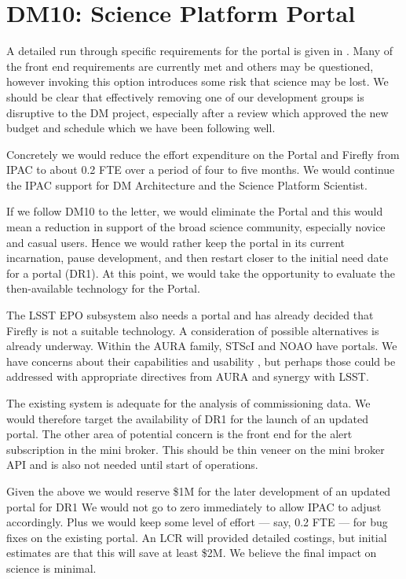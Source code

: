 \section{DM10: Science Platform Portal}\label{sect:dm10}

A detailed run through specific requirements for the portal is given in .
Many of the front end requirements are currently met and others may be questioned, however invoking this option introduces some risk that science may be lost.
We should be clear that effectively removing one of our development groups is disruptive to the DM project,
 especially after a
review which approved the new budget and schedule which we have been following well.

Concretely we would reduce the effort expenditure on the Portal and Firefly from IPAC to about 0.2 FTE over a period of four to five months.
We would continue the IPAC support for DM Architecture and the Science Platform Scientist.

If we follow DM10 to the letter, we would eliminate the Portal and this would mean a reduction in support of the broad science community,
especially novice and casual users.
Hence we would rather keep the portal in its current incarnation, pause development, and then restart closer
to the initial need date for a portal (DR1).
At this point, we would take the opportunity to evaluate the then-available technology for the Portal.

The LSST EPO subsystem also needs a portal and has already decided that
Firefly is not a suitable technology. A consideration of possible alternatives
is already underway.
Within the AURA family, STScI and NOAO have portals.
We have concerns about their capabilities and usability
,
but perhaps those could be addressed with appropriate directives from AURA and synergy with LSST.

The existing system is adequate for the analysis of commissioning data.
We would therefore target the availability of DR1 for the launch of an updated
portal.
The other area of potential concern is the front end for the alert subscription in the mini broker.
This should be  thin veneer on the mini broker API and is also not needed until start of operations.

Given the above we would reserve \$1M for the later development of an updated portal for DR1
We would not go to zero immediately to allow IPAC to adjust accordingly.
Plus we would keep some level of effort --- say, 0.2 FTE --- for bug fixes on the existing portal.
An LCR will provided detailed costings, but initial estimates are that this will save at least \$2M.
We believe the final impact on science is minimal.
